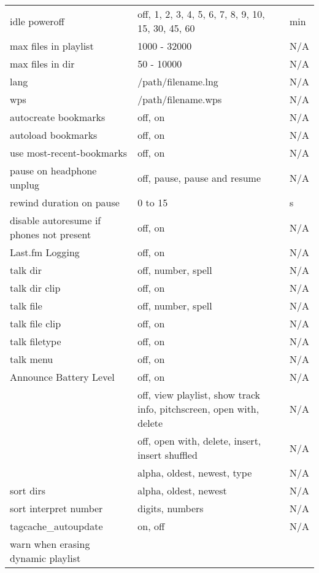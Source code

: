 \begin{center}
\begin{longtable}{>{\raggedright}p{}>{\raggedright}p{}p{}}
    idle poweroff   & off, 1, 2, 3, 4, 5, 6, 7, 8, 9, 10, 15, 30, 45, 60
                                        & min\\
    max files in playlist & 1000 - 32000 & N/A\\
    max files in dir & 50 - 10000       & N/A\\
    lang            & /path/filename.lng & N/A\\
    wps             & /path/filename.wps & N/A\\
    autocreate bookmarks
                    & off, on           & N/A\\
    autoload bookmarks
                    & off, on           & N/A\\
    use most-recent-bookmarks
                    & off, on           & N/A\\
    pause on headphone unplug & off, pause, pause and resume & N/A\\
    rewind duration on pause & 0 to 15  & s\\
    disable autoresume if phones not present & off, on & N/A\\
    Last.fm Logging & off, on           & N/A\\
    talk dir        & off, number, spell& N/A\\
    talk dir clip   & off, on           & N/A\\
    talk file       & off, number, spell& N/A\\
    talk file clip  & off, on           & N/A\\
    talk filetype   & off, on           & N/A\\
    talk menu       & off, on           & N/A\\
    Announce Battery Level & off, on    & N/A\\
    \opt{hotkey}{
    hotkey wps      & off, view playlist, show track info,
        pitchscreen, open with, delete  & N/A\\
    \nopt{touchscreen}{hotkey tree     & off, open with, delete, insert,
        insert shuffled                 & N/A\\}
    }
    sort files      & alpha, oldest, newest, type & N/A\\
    sort dirs       & alpha, oldest, newest & N/A\\
    sort interpret number & digits, numbers & N/A\\
    tagcache\_autoupdate
                    & on, off           & N/A\\
    warn when erasing dynamic playlist

\end{longtable}
\end{center}
